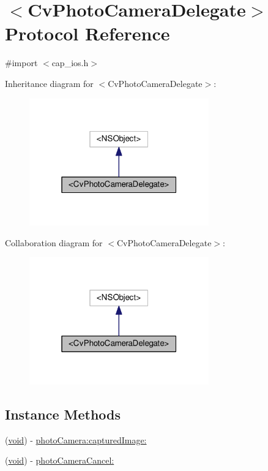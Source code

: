 \hypertarget{protocolCvPhotoCameraDelegate-p}{\section{$<$Cv\-Photo\-Camera\-Delegate$>$ Protocol Reference}
\label{protocolCvPhotoCameraDelegate-p}
}


{\ttfamily \#import $<$cap\-\_\-ios.\-h$>$}



Inheritance diagram for $<$Cv\-Photo\-Camera\-Delegate$>$\-:\nopagebreak
\begin{figure}[H]
\begin{center}
\leavevmode
\includegraphics[width=220pt]{protocolCvPhotoCameraDelegate-p__inherit__graph}
\end{center}
\end{figure}


Collaboration diagram for $<$Cv\-Photo\-Camera\-Delegate$>$\-:\nopagebreak
\begin{figure}[H]
\begin{center}
\leavevmode
\includegraphics[width=220pt]{protocolCvPhotoCameraDelegate-p__coll__graph}
\end{center}
\end{figure}
\subsection*{Instance Methods}
\begin{DoxyCompactItemize}
\item 
(\hyperlink{legacy_8hpp_a8bb47f092d473522721002c86c13b94e}{void}) -\/ \hyperlink{protocolCvPhotoCameraDelegate-p_ae07832370f835dde08b596ad94b64d33}{photo\-Camera\-:captured\-Image\-:}
\item 
(\hyperlink{legacy_8hpp_a8bb47f092d473522721002c86c13b94e}{void}) -\/ \hyperlink{protocolCvPhotoCameraDelegate-p_a3d8213557a1e506c2a19bc81ec208ada}{photo\-Camera\-Cancel\-:}
\end{DoxyCompactItemize}


